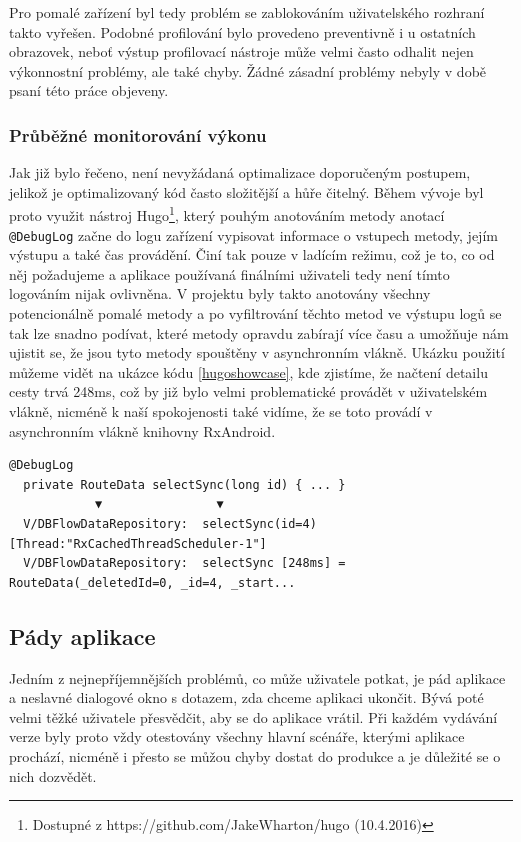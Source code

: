 \documentclass[czech,master,public,dept460,male,java,cpdeclaration]{diploma}
\begin{document}
Pro pomalé zařízení byl tedy problém se zablokováním uživatelského rozhraní takto vyřešen. Podobné
profilování bylo provedeno preventivně i u ostatních obrazovek, neboť výstup profilovací nástroje může
velmi často odhalit nejen výkonnostní problémy, ale také chyby. Žádné zásadní problémy nebyly
v době psaní této práce objeveny.

\subsubsection{Průběžné monitorování výkonu}
Jak již bylo řečeno, není nevyžádaná optimalizace doporučeným postupem, jelikož je optimalizovaný kód
často složitější a hůře čitelný. Během vývoje byl proto využit nástroj
Hugo\footnote{Dostupné z https://github.com/JakeWharton/hugo (10.4.2016)}, který pouhým
anotováním metody anotací \texttt{@DebugLog} začne do logu zařízení vypisovat informace o vstupech metody,
jejím výstupu a také čas provádění. Činí tak pouze v ladícím režimu, což je to, co od něj požadujeme
a aplikace používaná finálními uživateli tedy není tímto logováním nijak ovlivněna. V projektu byly
takto anotovány všechny potencionálně pomalé metody a po vyfiltrování těchto metod ve výstupu logů se
tak lze snadno podívat, které metody opravdu zabírají více času a umožňuje nám ujistit se, že jsou
tyto metody spouštěny v asynchronním vlákně. Ukázku použití můžeme vidět na ukázce kódu \ref{hugoshowcase},
kde zjistíme, že načtení detailu cesty trvá 248ms, což by již bylo velmi problematické provádět v uživatelském
vlákně, nicméně k naší spokojenosti také vidíme, že se toto provádí v asynchronním vlákně knihovny RxAndroid.

\begin{lstlisting}[label=hugoshowcase,caption=Využití nástroje Hugo pro výpisy informací o prováděných metodách]
  @DebugLog
  private RouteData selectSync(long id) { ... }
            ▼                ▼
  V/DBFlowDataRepository:  selectSync(id=4) [Thread:"RxCachedThreadScheduler-1"]
  V/DBFlowDataRepository:  selectSync [248ms] = RouteData(_deletedId=0, _id=4, _start...
\end{lstlisting}

\subsection{Pády aplikace}
Jedním z nejnepříjemnějších problémů, co může uživatele potkat, je pád aplikace a neslavné dialogové
okno s dotazem, zda chceme aplikaci ukončit. Bývá poté velmi těžké uživatele přesvědčit, aby se
do aplikace vrátil. Při každém vydávání verze byly proto vždy otestovány všechny hlavní scénáře,
kterými aplikace prochází, nicméně i přesto se můžou chyby dostat do produkce a je důležité se
 o nich dozvědět.
\end{document}
